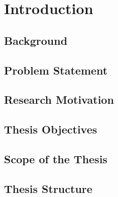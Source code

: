 \chapter{Introduction}
\label{cha:introduction}

\section{Background}

\section{Problem Statement}

\section{Research Motivation}

\section{Thesis Objectives}

\section{Scope of the Thesis}

\section{Thesis Structure}
